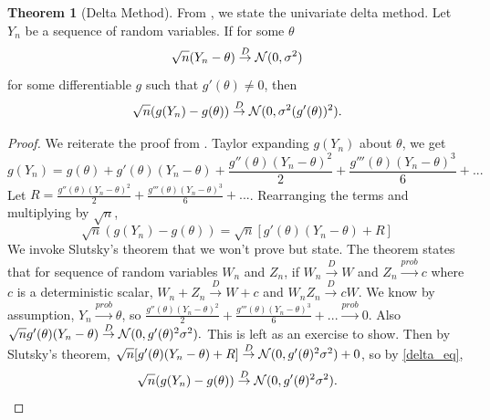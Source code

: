 \documentclass[10pt]{article}
\theoremstyle{definition}
\newtheorem{theorem}{Theorem}
\numberwithin{equation}{section}
\begin{document}
\begin{theorem}[Delta Method]\label{deltatheorem}
	From \cite{deltaweb}, we state the univariate delta method. Let $Y_n$ be a sequence of random variables. If for some $\theta$
	\begin{equation}
	\sqrt{n}(Y_n - \theta) \overset{D}{\to} \mathcal{N}(0,\sigma^2)
	\end{equation}
	for some differentiable $g$ such that $g'(\theta) \neq 0$, then
	\begin{equation}
		\sqrt{n}(g(Y_n) - g(\theta)) \overset{D}{\to} \mathcal{N}(0, \sigma^2 (g'(\theta))^2).
	\end{equation}
	\begin{proof}
		We reiterate the proof from \cite{deltaweb}. Taylor expanding $g(Y_n)$ about $\theta$, we get 
		\begin{equation}
		g(Y_n) = g(\theta) + g'(\theta)(Y_n - \theta) + \frac{g''(\theta)(Y_n - \theta)^2}{2} + \frac{g'''(\theta)(Y_n - \theta)^3}{6} + ... \nonumber
		\end{equation}
		Let $R = \frac{g''(\theta)(Y_n - \theta)^2}{2} + \frac{g'''(\theta)(Y_n - \theta)^3}{6} + ...$. Rearranging the terms and multiplying by $\sqrt{n}$,
		\begin{equation} \label{delta_eq}
		\sqrt{n}(g(Y_n) - g(\theta)) = \sqrt{n}[g'(\theta)(Y_n - \theta) + R] 
		\end{equation}
		We invoke Slutsky's theorem that we won't prove but state. The theorem states that for sequence of random variables $W_n$ and $Z_n$, if $W_n \overset{D}{\to} W$ and $Z_n \overset{prob}{\to} c$ where $c$ is a deterministic scalar, $W_n + Z_n \overset{D}{\to} W + c$ and $W_nZ_n \overset{D}{\to} cW$.
		We know by assumption, $Y_n \overset{prob}{\to} \theta $, so $\frac{g''(\theta)(Y_n - \theta)^2}{2} + \frac{g'''(\theta)(Y_n - \theta)^3}{6} + ... \overset{prob}{\to} 0$. Also $\sqrt{n}g'(\theta)(Y_n - \theta) \overset{D}{\to} \mathcal{N}(0,g'(\theta)^2\sigma^2).$ This is left as an exercise to show. Then by Slutsky's theorem,
		$\sqrt{n}[g'(\theta)(Y_n - \theta) + R] \overset{D}{\to} \mathcal{N}(0,g'(\theta)^2\sigma^2) + 0$, so by \eqref{delta_eq}, 
		$$ \sqrt{n}(g(Y_n) - g(\theta)) \overset{D}{\to} \mathcal{N}(0,g'(\theta)^2\sigma^2). $$
	\end{proof}
	
\end{theorem}
\end{document}
